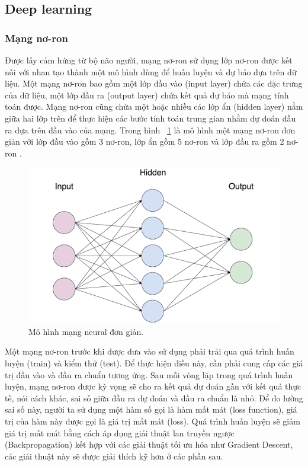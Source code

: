 \documentclass[a4paper,14pt]{extreport}
\begin{document}
\subsection{Deep learning}

\subsubsection*{ Mạng nơ-ron }

Được lấy cảm hứng từ bộ não người, mạng nơ-ron sử dụng lớp nơ-ron được kết nối với nhau tạo thành một mô hình dùng để huấn luyện và dự báo dựa trên dữ liệu. Một mạng nơ-ron bao gồm một lớp đầu vào (input layer) chứa các đặc trưng của dữ liệu, một lớp đầu ra (output layer) chứa kết quả dự báo mà mạng tính toán được. Mạng nơ-ron cũng chứa một hoặc nhiều các lớp ẩn (hidden layer) nằm giữa hai lớp trên để thực hiện các bước tính toán trung gian nhằm dự đoán đầu ra dựa trên đầu vào của mạng. Trong hình ~\ref{fig:simplenn} là mô hình một mạng nơ-ron đơn giản với lớp đầu vào gồm 3 nơ-ron, lớp ẩn gồm 5 nơ-ron và lớp đầu ra gồm 2 nơ-ron \cite{simple-neural-network}.

\begin{figure}[h]
    \centering
    \includegraphics[scale=0.6]{img/simple-neural-network.png}
    \caption{Mô hình mạng neural đơn giản. \cite{simple-neural-network}}
    \label{fig:simplenn}
\end{figure}

Một mạng nơ-ron trước khi được đưa vào sử dụng phải trải qua quá trình huấn luyện (train) và kiểm thử (test). 
Để thực hiện điều này, cần phải cung cấp các giá trị đầu vào và đầu ra chuẩn tương ứng. 
Sau mỗi vòng lặp trong quá trình huấn luyện, mạng nơ-ron được kỳ vọng sẽ cho ra kết quả dự đoán gần với kết quả thực tế, 
nói cách khác, sai số giữa đầu ra dự đoán và đầu ra chuẩn là nhỏ. Để đo lường sai số này, người ta sử dụng một hàm 
số gọi là hàm mất mát (loss function), giá trị của hàm này được gọi là giá trị mất mát (loss). 
Quá trình huấn luyện sẽ giảm giá trị mất mát bằng cách áp dụng giải thuật lan truyền ngược (Backpropagation) 
kết hợp với các giải thuật tối ưu hóa như Gradient Descent, các giải thuật này sẽ được giải thích kỹ hơn ở các phần sau.
\end{document}
